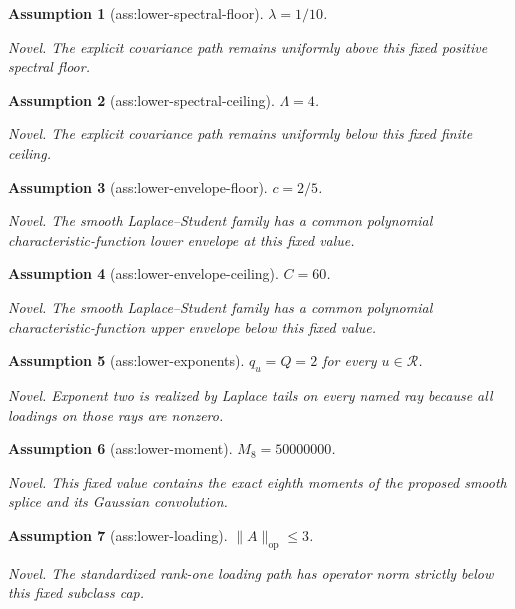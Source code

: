 \documentclass{article}
\newtheorem{assumption}{Assumption}
\begin{document}
\begin{assumption}[ass:lower-spectral-floor]\label{ass:lower-spectral-floor}
\(\lambda=1/10\).
\par\smallskip\noindent\emph{Novel.} The explicit covariance path remains uniformly above this fixed positive spectral floor.
\end{assumption}

\begin{assumption}[ass:lower-spectral-ceiling]\label{ass:lower-spectral-ceiling}
\(\Lambda=4\).
\par\smallskip\noindent\emph{Novel.} The explicit covariance path remains uniformly below this fixed finite ceiling.
\end{assumption}

\begin{assumption}[ass:lower-envelope-floor]\label{ass:lower-envelope-floor}
\(c=2/5\).
\par\smallskip\noindent\emph{Novel.} The smooth Laplace--Student family has a common polynomial characteristic-function lower envelope at this fixed value.
\end{assumption}

\begin{assumption}[ass:lower-envelope-ceiling]\label{ass:lower-envelope-ceiling}
\(C=60\).
\par\smallskip\noindent\emph{Novel.} The smooth Laplace--Student family has a common polynomial characteristic-function upper envelope below this fixed value.
\end{assumption}

\begin{assumption}[ass:lower-exponents]\label{ass:lower-exponents}
\(q_u=Q=2\) for every \(u\in\mathcal R\).
\par\smallskip\noindent\emph{Novel.} Exponent two is realized by Laplace tails on every named ray because all loadings on those rays are nonzero.
\end{assumption}

\begin{assumption}[ass:lower-moment]\label{ass:lower-moment}
\(M_8=50000000\).
\par\smallskip\noindent\emph{Novel.} This fixed value contains the exact eighth moments of the proposed smooth splice and its Gaussian convolution.
\end{assumption}

\begin{assumption}[ass:lower-loading]\label{ass:lower-loading}
\(\|A\|_{\mathrm{op}}\le3\).
\par\smallskip\noindent\emph{Novel.} The standardized rank-one loading path has operator norm strictly below this fixed subclass cap.
\end{assumption}
\end{document}
